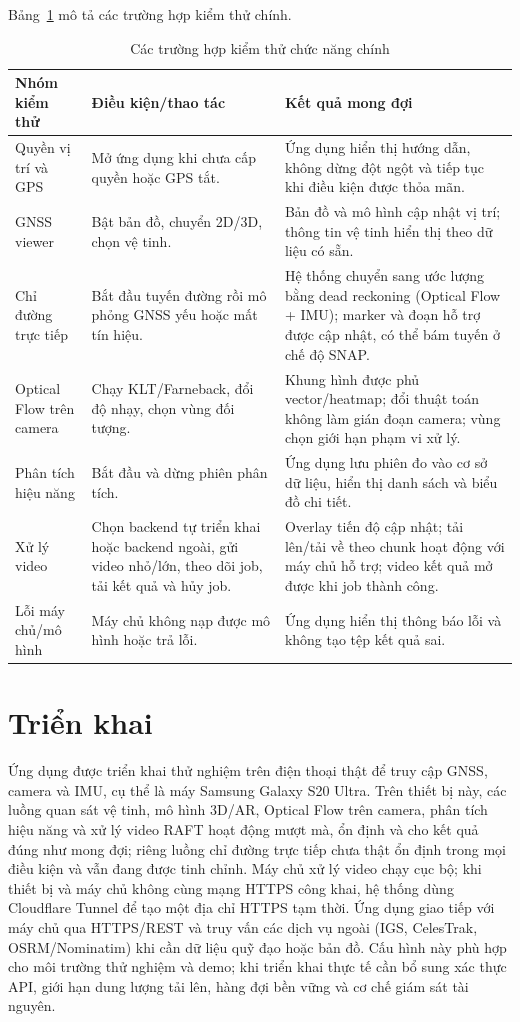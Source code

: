 \documentclass[../DoAn.tex]{subfiles}
\begin{document}
Bảng~\ref{table:test-cases} mô tả các trường hợp kiểm thử chính.

\begin{table}[htbp]
\centering
\begin{tabular}{|p{3.4cm}|p{4.7cm}|p{5.2cm}|}
\hline
\textbf{Nhóm kiểm thử} & \textbf{Điều kiện/thao tác} & \textbf{Kết quả mong đợi} \\ \hline
Quyền vị trí và GPS & Mở ứng dụng khi chưa cấp quyền hoặc GPS tắt. & Ứng dụng hiển thị hướng dẫn, không dừng đột ngột và tiếp tục khi điều kiện được thỏa mãn. \\ \hline
GNSS viewer & Bật bản đồ, chuyển 2D/3D, chọn vệ tinh. & Bản đồ và mô hình cập nhật vị trí; thông tin vệ tinh hiển thị theo dữ liệu có sẵn. \\ \hline
Chỉ đường trực tiếp & Bắt đầu tuyến đường rồi mô phỏng GNSS yếu hoặc mất tín hiệu. & Hệ thống chuyển sang ước lượng bằng dead reckoning (Optical Flow + IMU); marker và đoạn hỗ trợ được cập nhật, có thể bám tuyến ở chế độ SNAP. \\ \hline
Optical Flow trên camera & Chạy KLT/Farneback, đổi độ nhạy, chọn vùng đối tượng. & Khung hình được phủ vector/heatmap; đổi thuật toán không làm gián đoạn camera; vùng chọn giới hạn phạm vi xử lý. \\ \hline
Phân tích hiệu năng & Bắt đầu và dừng phiên phân tích. & Ứng dụng lưu phiên đo vào cơ sở dữ liệu, hiển thị danh sách và biểu đồ chi tiết. \\ \hline
Xử lý video & Chọn backend tự triển khai hoặc backend ngoài, gửi video nhỏ/lớn, theo dõi job, tải kết quả và hủy job. & Overlay tiến độ cập nhật; tải lên/tải về theo chunk hoạt động với máy chủ hỗ trợ; video kết quả mở được khi job thành công. \\ \hline
Lỗi máy chủ/mô hình & Máy chủ không nạp được mô hình hoặc trả lỗi. & Ứng dụng hiển thị thông báo lỗi và không tạo tệp kết quả sai. \\ \hline
\end{tabular}
\caption{Các trường hợp kiểm thử chức năng chính}
\label{table:test-cases}
\end{table}

\FloatBarrier
\section{Triển khai}
\label{section:4.5}
Ứng dụng được triển khai thử nghiệm trên điện thoại thật để truy cập GNSS, camera và IMU, cụ thể là máy Samsung Galaxy S20 Ultra. Trên thiết bị này, các luồng quan sát vệ tinh, mô hình 3D/AR, Optical Flow trên camera, phân tích hiệu năng và xử lý video RAFT hoạt động mượt mà, ổn định và cho kết quả đúng như mong đợi; riêng luồng chỉ đường trực tiếp chưa thật ổn định trong mọi điều kiện và vẫn đang được tinh chỉnh. Máy chủ xử lý video chạy cục bộ; khi thiết bị và máy chủ không cùng mạng HTTPS công khai, hệ thống dùng Cloudflare Tunnel để tạo một địa chỉ HTTPS tạm thời. Ứng dụng giao tiếp với máy chủ qua HTTPS/REST và truy vấn các dịch vụ ngoài (IGS, CelesTrak, OSRM/Nominatim) khi cần dữ liệu quỹ đạo hoặc bản đồ. Cấu hình này phù hợp cho môi trường thử nghiệm và demo; khi triển khai thực tế cần bổ sung xác thực API, giới hạn dung lượng tải lên, hàng đợi bền vững và cơ chế giám sát tài nguyên.
\end{document}
